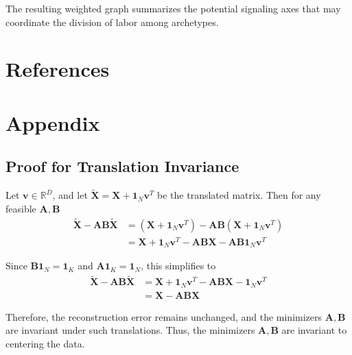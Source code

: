 \documentclass[oneside]{article}
\begin{document}
The resulting weighted graph summarizes the potential signaling axes that may coordinate the division of labor among archetypes.

\section{References}

\printbibliography[heading=none]

\clearpage
\section{Appendix}

\subsection{Proof for Translation Invariance}
\label{subsec:translation_invariance}

Let $\mathbf{v} \in \mathbb{R}^{D}$, and let $\tilde{\mathbf{X}} = \mathbf{X} + \mathbf{1}_N \mathbf{v}^T$ be the translated matrix. Then for any feasible $\mathbf{A}, \mathbf{B}$
\begin{equation}
    \begin{aligned}
    \tilde{\mathbf{X}} - \mathbf{A} \mathbf{B} \tilde{\mathbf{X}}
    &= \left(\mathbf{X} + \mathbf{1}_N \mathbf{v}^T \right) - \mathbf{A} \mathbf{B} \left(\mathbf{X} + \mathbf{1}_N \mathbf{v}^T \right) \\
    &= \mathbf{X} + \mathbf{1}_N \mathbf{v}^T - \mathbf{A} \mathbf{B} \mathbf{X} -  \mathbf{A} \mathbf{B} \mathbf{1}_N \mathbf{v}^T
    \end{aligned}
\end{equation}

Since $\mathbf{B} \mathbf{1}_N = \mathbf{1}_K$ and  $\mathbf{A} \mathbf{1}_K = \mathbf{1}_N$, this simplifies to
\begin{equation}
    \begin{aligned}
    \tilde{\mathbf{X}} - \mathbf{A} \mathbf{B} \tilde{\mathbf{X}}
    &= \mathbf{X} + \mathbf{1}_N \mathbf{v}^T - \mathbf{A} \mathbf{B} \mathbf{X} - \mathbf{1}_N \mathbf{v}^T \\
    &= \mathbf{X} - \mathbf{A} \mathbf{B} \mathbf{X}
    \end{aligned}
\end{equation}

Therefore, the reconstruction error remains unchanged, and the minimizers $\mathbf{A}, \mathbf{B}$ are invariant under such translations. Thus, the minimizers $\mathbf{A}, \mathbf{B}$ are invariant to centering the data.
\end{document}
